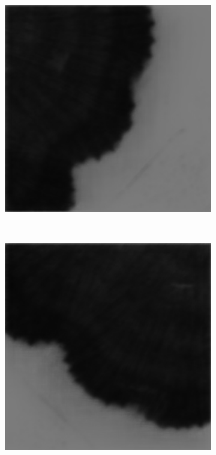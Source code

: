 \begin{figure}[t]
    \centering
    \begin{subfigure}[t]{0.32\textwidth}
        \centering
        \includegraphics[width=1\textwidth, valign=c]{images/sgd1.png}
    \end{subfigure}
    ~
    \begin{subfigure}[t]{0.32\textwidth}
        \centering
        \includegraphics[width=1\textwidth, valign=c]{images/sgd5.png}

\end{subfigure}
\end{figure}
